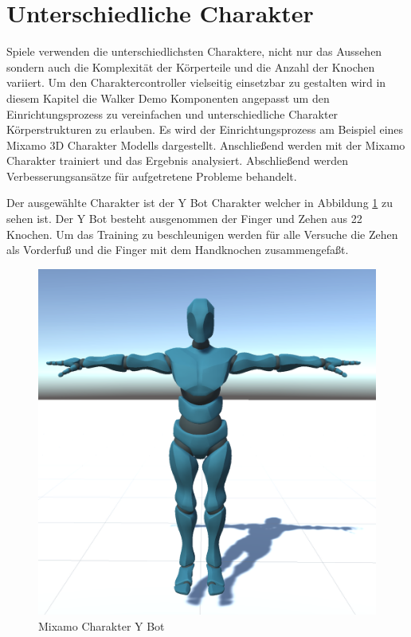 \section{Unterschiedliche Charakter}
Spiele verwenden die unterschiedlichsten Charaktere, nicht nur das Aussehen sondern auch die Komplexität der Körperteile und die Anzahl der Knochen variiert. Um den Charaktercontroller vielseitig einsetzbar zu gestalten wird in diesem Kapitel die Walker Demo Komponenten angepasst um den Einrichtungsprozess zu vereinfachen und unterschiedliche Charakter Körperstrukturen zu erlauben. Es wird der Einrichtungsprozess am Beispiel eines Mixamo 3D Charakter Modells dargestellt. Anschließend werden mit der Mixamo Charakter trainiert und das Ergebnis analysiert. Abschließend werden Verbesserungsansätze für aufgetretene Probleme behandelt.

Der ausgewählte Charakter ist der Y Bot Charakter welcher in Abbildung \ref{fig:charakter_mixamo} zu sehen ist. Der Y Bot besteht ausgenommen der Finger und Zehen aus 22 Knochen. Um das Training zu beschleunigen werden für alle Versuche die Zehen als Vorderfuß und die Finger mit dem Handknochen zusammengefaßt.

\begin{figure}[H]
  \centering  
  \includegraphics[scale=0.5]{img/charakter_mixamo}
  \caption{Mixamo Charakter Y Bot}
  \label{fig:charakter_mixamo}
\end{figure}

